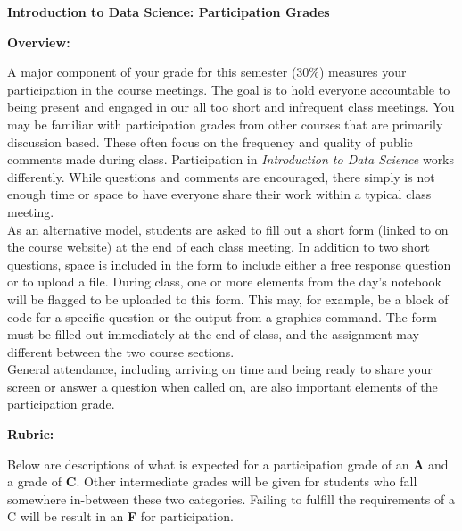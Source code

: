 \documentclass[12pt, a4paper]{article}
\makeatletter
\newcommand{\magenta}[1]{\textcolor{solarized@magenta}{#1}}
\makeatother
\begin{document}
\begin{center}
\textbf{Introduction to Data Science: Participation Grades}
\end{center}

\vspace{0.5cm}

\textbf{Overview:} \vspace{6pt}

A major component of your grade for this semester (30\%) measures your
participation in the course meetings. The goal is to hold everyone
accountable to being present and engaged in our all too short and infrequent
class meetings. You may be familiar with participation grades from other
courses that are primarily discussion based. These often focus on the
frequency and quality of public comments made during class. Participation in
\textit{Introduction to Data Science} works differently. While questions and
comments are encouraged, there simply is not enough time or space to have
everyone share their work within a typical class meeting. \\

As an alternative model, students are asked to fill out a short form (linked
to on the course website) at the end of each class meeting. In addition to
two short questions, space is included in the form to include either a free
response question or to upload a file. During class, one or more elements from
the day's notebook will be flagged to be uploaded to this form. This may,
for example, be a block of code for a specific question or the output from
a graphics command. The form must be filled out immediately at the end of
class, and the assignment may different between the two course sections. \\

General attendance, including arriving on time and being ready to share your
screen or answer a question when called on, are also important elements of
the participation grade.

\bigskip

\textbf{Rubric:} \vspace{6pt}

Below are descriptions of what is expected for a participation grade of an
\textbf{\magenta{A}} and a grade of \textbf{\magenta{C}}. Other intermediate
grades will be given for students who fall somewhere in-between these two
categories. Failing to fulfill the requirements of a C will be result in an
\textbf{\magenta{F}} for participation. \\
\end{document}
